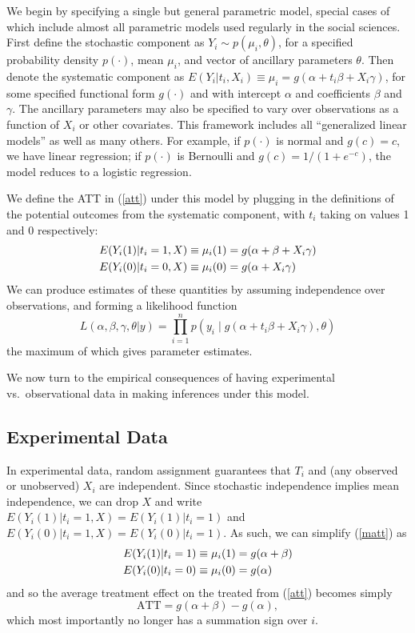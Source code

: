 \documentclass[11pt,titlepage]{article}
\begin{document}
We begin by specifying a single but general parametric model, special
cases of which include almost all parametric models used regularly in
the social sciences.  First define the stochastic component as $Y_i
\sim p(\mu_i,\theta)$, for a specified probability density $p(\cdot)$,
mean $\mu_i$, and vector of ancillary parameters $\theta$.  Then
denote the systematic component as $E(Y_i|t_i,X_i)\equiv\mu_i=g(\alpha
+ t_i\beta + X_i\gamma)$, for some specified functional form
$g(\cdot)$ and with intercept $\alpha$ and coefficients $\beta$ and
$\gamma$.  The ancillary parameters may also be specified to vary over
observations as a function of $X_i$ or other covariates.  This
framework includes all ``generalized linear models'' as well as many
others.  For example, if $p(\cdot)$ is normal and $g(c)=c$, we have
linear regression; if $p(\cdot)$ is Bernoulli and $g(c)=1/(1+e^{-c})$,
the model reduces to a logistic regression.

We define the ATT in (\ref{att}) under this model by plugging in the
definitions of the potential outcomes from the systematic component,
with $t_i$ taking on values 1 and 0 respectively:
\begin{align}
  \label{matt}
  E(Y_i(1)|t_i=1,X) &\equiv \mu_i(1) = g(\alpha + \beta + X_i\gamma)\notag \\
  E(Y_i(0)|t_i=0,X) &\equiv \mu_i(0) = g(\alpha + X_i\gamma)
\end{align}
We can produce estimates of these quantities by assuming independence
over observations, and forming a likelihood function
\begin{equation}
  \label{lik}
  L(\alpha,\beta,\gamma,\theta|y) = \prod_{i=1}^n 
  p\left(y_i \mid g(\alpha + t_i\beta + X_i\gamma), \theta\right)
\end{equation}
the maximum of which gives parameter estimates.

We now turn to the empirical consequences of having experimental vs.\ 
observational data in making inferences under this model.

\subsection{Experimental Data}\label{s:paraexp}

In experimental data, random assignment guarantees that $T_i$ and (any
observed or unobserved) $X_i$ are independent.  Since stochastic
independence implies mean independence, we can drop $X$ and write
$E(Y_i(1)|t_i=1,X)=E(Y_i(1)|t_i=1)$ and
$E(Y_i(0)|t_i=1,X)=E(Y_i(0)|t_i=1)$.  As such, we can simplify
(\ref{matt}) as
\begin{align}
  \label{smatt}
  E(Y_i(1)|t_i=1) &\equiv \mu_i(1) = g(\alpha + \beta)\notag \\
  E(Y_i(0)|t_i=0) &\equiv \mu_i(0) = g(\alpha)
\end{align}
and so the average treatment effect on the treated from (\ref{att})
becomes simply
\begin{equation}
  \label{satt}
  \text{ATT} = g(\alpha+\beta) - g(\alpha),
\end{equation}
which most importantly no longer has a summation sign over $i$.
\end{document}
